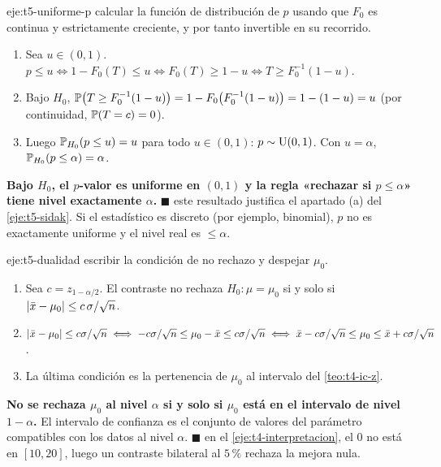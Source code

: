 \begin{solucion}{eje:t5-uniforme-p}
\planteamiento calcular la función de distribución de $p$ usando que $F_0$ es continua y estrictamente creciente, y por tanto invertible en su recorrido.
\pasos
\begin{enumerate}[label=\arabic*.]
  \item Sea $u\in(0,1)$. $p\le u\iff1-F_0(T)\le u\iff F_0(T)\ge1-u\iff T\ge F_0^{-1}(1-u)$.
  \item Bajo $H_0$, $\mathbb{P}\bigl(T\ge F_0^{-1}(1-u)\bigr)=1-F_0\bigl(F_0^{-1}(1-u)\bigr)=1-(1-u)=u$ (por continuidad, $\mathbb{P}(T=c)=0$).
  \item Luego $\mathbb{P}_{H_0}(p\le u)=u$ para todo $u\in(0,1)$: $p\sim\operatorname{U}(0,1)$. Con $u=\alpha$, $\mathbb{P}_{H_0}(p\le\alpha)=\alpha$.
\end{enumerate}
\resultado \textbf{Bajo $H_0$, el $p$-valor es uniforme en $(0,1)$ y la regla «rechazar si $p\le\alpha$» tiene nivel exactamente $\alpha$.} $\blacksquare$
\comprobacion este resultado justifica el apartado (a) del \cref{eje:t5-sidak}. Si el estadístico es discreto (por ejemplo, binomial), $p$ no es exactamente uniforme y el nivel real es $\le\alpha$.
\end{solucion}

\begin{solucion}{eje:t5-dualidad}
\planteamiento escribir la condición de no rechazo y despejar $\mu_0$.
\pasos
\begin{enumerate}[label=\arabic*.]
  \item Sea $c=z_{1-\alpha/2}$. El contraste no rechaza $H_0:\mu=\mu_0$ si y solo si $\lvert\bar{x}-\mu_0\rvert\le c\,\sigma/\sqrt n$.
  \item $\lvert\bar{x}-\mu_0\rvert\le c\sigma/\sqrt n\iff-c\sigma/\sqrt n\le\mu_0-\bar{x}\le c\sigma/\sqrt n\iff\bar{x}-c\sigma/\sqrt n\le\mu_0\le\bar{x}+c\sigma/\sqrt n$.
  \item La última condición es la pertenencia de $\mu_0$ al intervalo del \cref{teo:t4-ic-z}.
\end{enumerate}
\resultado \textbf{No se rechaza $\mu_0$ al nivel $\alpha$ si y solo si $\mu_0$ está en el intervalo de nivel $1-\alpha$.} El intervalo de confianza es el conjunto de valores del parámetro compatibles con los datos al nivel $\alpha$. $\blacksquare$
\comprobacion en el \cref{eje:t4-interpretacion}, el $0$ no está en $[10,20]$, luego un contraste bilateral al $5\,\%$ rechaza la mejora nula.
\end{solucion}

